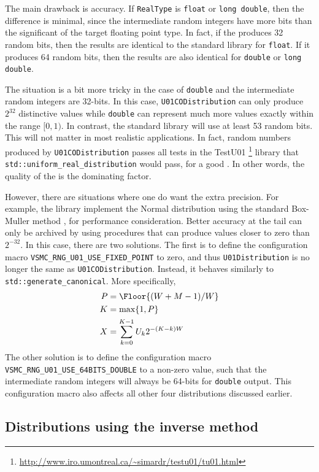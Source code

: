 The main drawback is accuracy. If \verb|RealType| is \verb|float| or
\verb|long double|, then the difference is minimal, since the intermediate
random integers have more bits than the significant of the target floating
point type. In fact, if the \rng produces 32 random bits, then the results are
identical to the standard library for \verb|float|. If it produces 64 random
bits, then the results are also identical for \verb|double| or
\verb|long double|.

The situation is a bit more tricky in the case of \verb|double| and the
intermediate random integers are 32-bits. In this case,
\verb|U01CODistribution| can only produce $2^{32}$ distinctive values while
\verb|double| can represent much more values exactly within the range $[0, 1)$.
In contrast, the standard library will use at least 53 random bits. This will
not matter in most realistic applications. In fact, random numbers produced by
\verb|U01CODistribution| passes all tests in the
{\lnfigures\tbfigures TestU01}%
\footnote{\url{http://www.iro.umontreal.ca/~simardr/testu01/tu01.html}}
library that \verb|std::uniform_real_distribution| would pass, for a good \rng.
In other words, the quality of the \rng is the dominating factor.

However, there are situations where one do want the extra precision. For
example, the library implement the Normal distribution using the standard
Box-Muller method \parencite{Box:1958hv}, for performance consideration. Better
accuracy at the tail can only be archived by using procedures that can produce
values closer to zero than $2^{-32}$. In this case, there are two solutions.
The first is to define the configuration macro
\verb|VSMC_RNG_U01_USE_FIXED_POINT| to zero, and thus \verb|U01Distribution| is
no longer the same as \verb|U01CODistribution|. Instead, it behaves similarly
to \verb|std::generate_canonical|. More specifically,
\begin{align*}
  P &= \Floor{(W + M - 1) / W} \\
  K &= \max\{1, P\} \\
  X &= \sum_{k=0}^{K - 1} U_k 2^{-(K - k)W}
\end{align*}
The other solution is to define the configuration macro
\verb|VSMC_RNG_U01_USE_64BITS_DOUBLE| to a non-zero value, such that the
intermediate random integers will always be 64-bits for \verb|double| output.
This configuration macro also affects all other four distributions discussed
earlier.

\subsection{Distributions using the inverse method}
\label{sub:Distributions using the inverse method}

